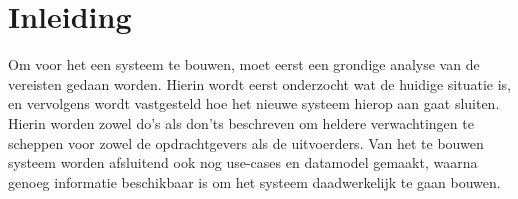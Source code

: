 \section{Inleiding}
\label{inleiding}

Om voor het \casamproject een systeem te bouwen,
moet eerst een grondige analyse van de vereisten gedaan worden.
Hierin wordt eerst onderzocht wat de huidige situatie is,
en vervolgens wordt vastgesteld hoe het nieuwe systeem hierop aan gaat sluiten.
Hierin worden zowel do's als don'ts beschreven om heldere verwachtingen te scheppen
voor zowel de opdrachtgevers als de uitvoerders.
Van het te bouwen systeem worden afsluitend ook nog use-cases en datamodel gemaakt,
waarna genoeg informatie beschikbaar is om het systeem daadwerkelijk te gaan bouwen.
